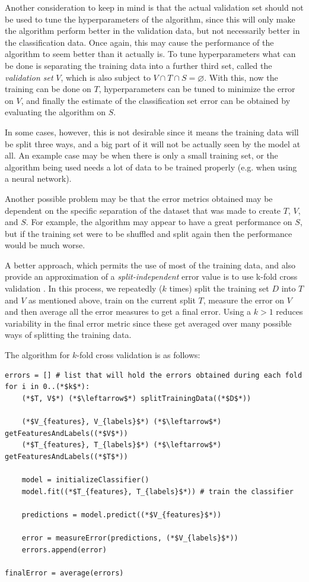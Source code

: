\documentclass[epsfig,a4paper,11pt,titlepage,twoside,openany]{book}
\begin{document}
Another consideration to keep in mind is that the actual validation set should not be used to tune the hyperparameters of the algorithm, since this will only make the algorithm perform better in the validation data, but not necessarily better in the classification data. Once again, this may cause the performance of the algorithm to seem better than it actually is. To tune hyperparameters what can be done is separating the training data into a further third set, called the \textit{validation set} $V$, which is also subject to $V \cap T \cap S = \varnothing$. With this, now the training can be done on $T$, hyperparameters can be tuned to minimize the error on $V$, and finally the estimate of the classification set error can be obtained by evaluating the algorithm on $S$.

In some cases, however, this is not desirable since it means the training data will be split three ways, and a big part of it will not be actually seen by the model at all. An example case may be when there is only a small training set, or the algorithm being used needs a lot of data to be trained properly (e.g. when using a neural network).

Another possible problem may be that the error metrics obtained may be dependent on the specific separation of the dataset that was made to create $T$, $V$, and $S$. For example, the algorithm may appear to have a great performance on $S$, but if the training set were to be shuffled and split again then the performance would be much worse.

A better approach, which permits the use of most of the training data, and also provide an approximation of a \textit{split-independent} error value is to use k-fold cross validation \cite{Kohavi:1995_study_of_cross_validation,Cawley:2010_crossval_model_selection}. In this process, we repeatedly ($k$ times) split the training set $D$ into $T$ and $V$ as mentioned above, train on the current split $T$, measure the error on $V$ and then average all the error measures to get a final error. Using a $k > 1$ reduces variability in the final error metric since these get averaged over many possible ways of splitting the training data.

The algorithm for $k$-fold cross validation is as follows:

\begin{lstlisting}
errors = [] # list that will hold the errors obtained during each fold
for i in 0..(*$k$*):
    (*$T, V$*) (*$\leftarrow$*) splitTrainingData((*$D$*))
    
    (*$V_{features}, V_{labels}$*) (*$\leftarrow$*) getFeaturesAndLabels((*$V$*))
    (*$T_{features}, T_{labels}$*) (*$\leftarrow$*) getFeaturesAndLabels((*$T$*))

    model = initializeClassifier()
    model.fit((*$T_{features}, T_{labels}$*)) # train the classifier
    
    predictions = model.predict((*$V_{features}$*))
    
    error = measureError(predictions, (*$V_{labels}$*))
    errors.append(error)
    
finalError = average(errors)
\end{lstlisting}
\end{document}
